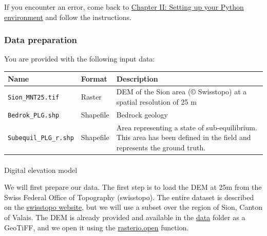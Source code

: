 \documentclass[
  letterpaper,
  DIV=11,
  numbers=noendperiod]{scrartcl}
\makeatletter
\let\oldparagraph\paragraph
\renewcommand{\paragraph}{
    \@ifstar
      \xxxParagraphStar
      \xxxParagraphNoStar
  }
\newcommand{\xxxParagraphStar}[1]{\oldparagraph*{#1}\mbox{}}
\newcommand{\xxxParagraphNoStar}[1]{\oldparagraph{#1}\mbox{}}
\makeatother
\begin{document}
If you encounter an error, come back to
\href{https://unige-cgeom.github.io/SPACE-GEOLOGY/course/chapter2_setup.html}{Chapter
II: Setting up your Python environment} and follow the instructions.

\subsubsection{Data preparation}\label{data-preparation}

You are provided with the following input data:

\begin{longtable}[]{@{}
  >{\raggedright\arraybackslash}p{}
  >{\raggedright\arraybackslash}p{}
  >{\raggedright\arraybackslash}p{}@{}}
\toprule\noalign{}
\begin{minipage}[b]{\linewidth}\raggedright
Name
\end{minipage} & \begin{minipage}[b]{\linewidth}\raggedright
Format
\end{minipage} & \begin{minipage}[b]{\linewidth}\raggedright
Description
\end{minipage} \\
\midrule\noalign{}
\endhead
\bottomrule\noalign{}
\endlastfoot
\texttt{Sion\_MNT25.tif} & Raster & DEM of the Sion area (© Swisstopo)
at a spatial resolution of 25 m \\
\texttt{Bedrok\_PLG.shp} & Shapefile & Bedrock geology \\
\texttt{Subequil\_PLG\_r.shp} & Shapefile & Area representing a state of
sub-equilibrium. This area has been defined in the field and represents
the ground truth. \\
\end{longtable}

\paragraph{Digital elevation model}\label{digital-elevation-model}

We will first prepare our data. The first step is to load the DEM at 25m
from the Swiss Federal Office of Topography (swisstopo). The entire
dataset is described on the
\href{https://www.swisstopo.admin.ch/fr/modele-altimetrique-mnt25}{swisstopo
website}, but we will use a subset over the region of Sion, Canton of
Valais. The DEM is already provided and available in the
\href{https://github.com/unige-cgeom/SPACE-GEOLOGY/tree/main/course/data}{data}
folder as a GeoTiFF, and we open it using the
\href{https://rasterio.readthedocs.io/en/latest/api/rasterio.html\#rasterio.open}{rasterio.open}
function.
\end{document}
